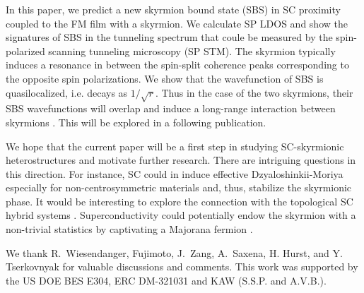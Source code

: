 \documentclass[twocolumn,showpacs,floatfix,longbibliography]{revtex4-1}
\begin{document}
In this paper, we predict a new skyrmion bound state (SBS) in SC proximity coupled to the FM film with a skyrmion. We calculate SP LDOS and show the signatures of SBS in the tunneling spectrum that coule be measured by the spin-polarized scanning tunneling microscopy (SP STM). The skyrmion typically induces a resonance in between the spin-split coherence peaks corresponding to the opposite spin polarizations. We show that the wavefunction of SBS is quasilocalized, i.e. decays as $1/\sqrt{r}$. Thus in the case of the two skyrmions, their SBS wavefunctions will overlap and induce a long-range interaction between skyrmions \cite{Yao2014,Menard2015}. This will be explored in a following publication. 

We hope that the current paper will be a first step in studying SC-skyrmionic heterostructures and motivate further research. There are intriguing questions in this direction. For instance, SC could in induce effective Dzyaloshinkii-Moriya especially for non-centrosymmetric materials and, thus, stabilize the skyrmionic phase. It would be interesting to explore the connection with the topological SC hybrid systems \cite{Alicea2012}. Superconductivity could potentially endow the skyrmion with a non-trivial statistics by captivating a Majorana fermion \cite{Kim2015}. 



We thank  R.~Wiesendanger, Fujimoto, J.~Zang, A.~Saxena, H. Hurst, and Y. Tserkovnyak for valuable discussions and comments. This work was supported by the US DOE BES E304, ERC DM-321031 and KAW (S.S.P. and A.V.B.). 

\newpage

%



\appendix 

\end{document}
